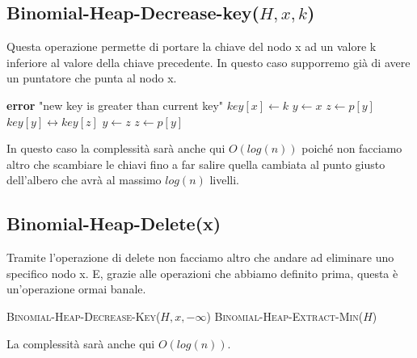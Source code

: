 \subsection{Binomial-Heap-Decrease-key($H,x,k$)}
Questa operazione permette di portare la chiave del nodo x ad un valore k inferiore al valore della chiave precedente. In questo caso supporremo già di avere un puntatore che punta al nodo x.

\begin{algorithm}[H]
\caption{BINOMIAL-HEAP-DECREASE-KEY($H, x, k$)}
\begin{algorithmic}[1]
        \State \textbf{error} "new key is greater than current key"
    \EndIf
    \State $key[x] \gets k$
    \State $y \gets x$
    \State $z \gets p[y]$
        \State {} $key[y] \leftrightarrow key[z]$
        \State $y \gets z$
        \State $z \gets p[y]$
    \EndWhile
\end{algorithmic}
\end{algorithm}

In questo caso la complessità sarà anche qui $O(log(n))$ poiché non facciamo altro che scambiare le chiavi fino a far salire quella cambiata al punto giusto dell'albero che avrà al massimo $log(n)$ livelli.

\subsection{Binomial-Heap-Delete(x)}
Tramite l'operazione di delete non facciamo altro che andare ad eliminare uno specifico nodo x. E, grazie alle operazioni che abbiamo definito prima, questa è un'operazione ormai banale. 

\begin{algorithm}[H]
\caption{BINOMIAL-HEAP-DELETE($H, x$)}
\begin{algorithmic}[1]
    \State \textsc{Binomial-Heap-Decrease-Key}($H, x, -\infty$)
    \State \textsc{Binomial-Heap-Extract-Min}($H$)
\end{algorithmic}
\end{algorithm}

La complessità sarà anche qui $O(log(n))$.
